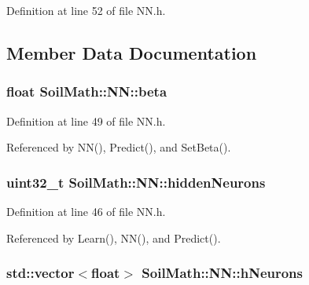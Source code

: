 Definition at line 52 of file N\+N.\+h.



\subsection{Member Data Documentation}
\hypertarget{class_soil_math_1_1_n_n_a4bb773955d78fa6f064b39a9149b78c8}{}
\subsubsection[{beta}]{\setlength{\rightskip}{0pt plus 5cm}float Soil\+Math\+::\+N\+N\+::beta\hspace{0.3cm}{\ttfamily [private]}}\label{class_soil_math_1_1_n_n_a4bb773955d78fa6f064b39a9149b78c8}


Definition at line 49 of file N\+N.\+h.



Referenced by N\+N(), Predict(), and Set\+Beta().

\hypertarget{class_soil_math_1_1_n_n_aedf4b2ddaae281d83e666c308e5d67c4}{}
\subsubsection[{hidden\+Neurons}]{\setlength{\rightskip}{0pt plus 5cm}uint32\+\_\+t Soil\+Math\+::\+N\+N\+::hidden\+Neurons\hspace{0.3cm}{\ttfamily [private]}}\label{class_soil_math_1_1_n_n_aedf4b2ddaae281d83e666c308e5d67c4}


Definition at line 46 of file N\+N.\+h.



Referenced by Learn(), N\+N(), and Predict().

\hypertarget{class_soil_math_1_1_n_n_a459bde01ce33e0b27803cbe4a3b114b4}{}
\subsubsection[{h\+Neurons}]{\setlength{\rightskip}{0pt plus 5cm}std\+::vector$<$float$>$ Soil\+Math\+::\+N\+N\+::h\+Neurons\hspace{0.3cm}{\ttfamily [private]}}\label{class_soil_math_1_1_n_n_a459bde01ce33e0b27803cbe4a3b114b4}


